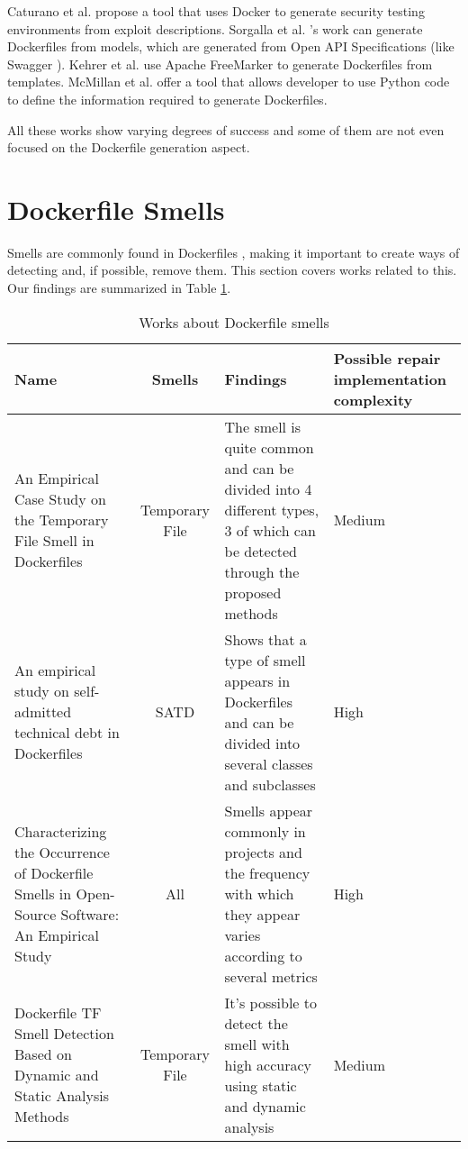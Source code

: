 Caturano et al. \cite{caturanoExploitWP2DockerPlatformAutomating2022} propose a tool that uses Docker to generate security testing environments from exploit descriptions. Sorgalla et al. \cite{sorgallaApplyingModelDrivenEngineering2021}'s work can generate Dockerfiles from models, which are generated from Open API Specifications (like Swagger \cite{Swagger}). Kehrer et al. \cite{kehrerContainerBasedModuleIsolation2019} use Apache FreeMarker \cite{ApacheFreeMarker} to generate Dockerfiles from templates. McMillan et al. \cite{mcmillanMAKINGCONTAINERSEASIER} offer a tool that allows developer to use Python code to define the information required to generate Dockerfiles.

All these works show varying degrees of success and some of them are not even focused on the Dockerfile generation aspect.

\section{Dockerfile Smells} \label{sec:dockerfile_smells}

Smells are commonly found in Dockerfiles \cite{wuCharacterizingOccurrenceDockerfile2020}, making it important to create ways of detecting and, if possible, remove them. This section covers works related to this. Our findings are summarized in Table \ref{tab:works_dockerfile_smells}.

\begin{table}[H]
    \centering
    \begin{tabular}{|p{}|c|p{}|p{}|}
        \hline \textbf{Name} & \textbf{Smells} & \textbf{Findings} & \textbf{Possible repair implementation complexity} \\
        \hline An Empirical Case Study on the Temporary File Smell in Dockerfiles \cite{luEmpiricalCaseStudy2019} & Temporary File & The smell is quite common and can be divided into 4 different types, 3 of which can be detected through the proposed methods & Medium \\
        \hline An empirical study on self-admitted technical debt in Dockerfiles \cite{azumaEmpiricalStudySelfadmitted2022} & SATD & Shows that a type of smell appears in Dockerfiles and can be divided into several classes and subclasses & High \\
        \hline Characterizing the Occurrence of Dockerfile Smells in Open-Source Software: An Empirical Study \cite{wuCharacterizingOccurrenceDockerfile2020} & All & Smells appear commonly in projects and the frequency with which they appear varies according to several metrics & High \\
        \hline Dockerfile TF Smell Detection Based on Dynamic and Static Analysis Methods \cite{xuDockerfileTFSmell2019} & Temporary File & It's possible to detect the smell with high accuracy using static and dynamic analysis & Medium \\
        \hline
    \end{tabular} 
    \caption{Works about Dockerfile smells}
    \label{tab:works_dockerfile_smells}
\end{table}

